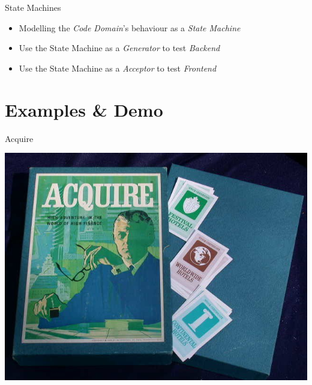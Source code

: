 \begin{frame}[fragile]{State Machines}
  \begin{itemize}
  \item Modelling the \emph{Code Domain}'s behaviour as a \emph{State Machine}
  \item Use the State Machine as a \emph{Generator} to test \emph{Backend}
  \item Use the State Machine as a \emph{Acceptor} to test \emph{Frontend}
  \end{itemize}
\end{frame}



\section{Examples \& Demo}

\begin{frame}[fragile]{Acquire}
  \begin{center}
    \includegraphics[height=.8\textheight]{./images/acquire-boardgame.jpg}
  \end{center}
\end{frame}

